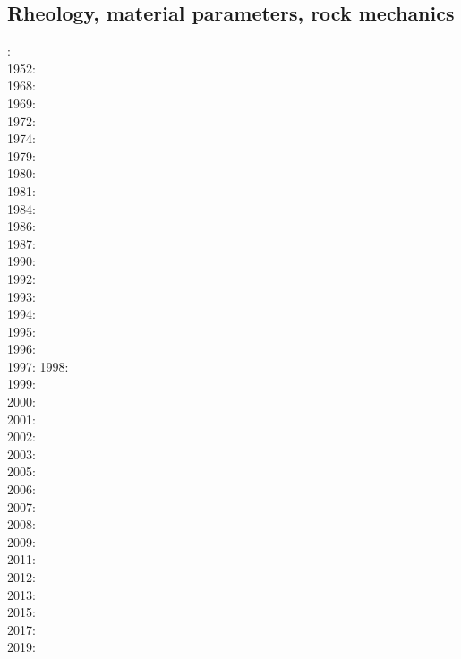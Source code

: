 \subsection{Rheology, material parameters, rock mechanics}

{\scriptsize
{}: \cite{druc51}\cite{hafn51}\\
1952: \cite{drpr52}\\
1968: \cite{byer68}\\
1969: \cite{hand69}\\
1972: \cite{carr72}\\
1974: \cite{kogo74}\\
1979: \cite{goev79}\cite{evgo79}\\
1980: \cite{brko80}\\
1981: \cite{delo81}\\
1984: \cite{rafi84}\cite{chpa84}\cite{vede84}\\
1986: \cite{kapf86}\\
1987: \cite{kikr87}\\
1990: \cite{wica90}\\
1992: \cite{bako92}\cite{chbo92}\cite{kali92}\cite{kohl92}\\
1993: \cite{kawu93}\\
1994: \cite{fran94}\\
1995: \cite{koem95}\cite{gltu95}\\
1996: \cite{wasd96}\cite{hiko96}\\
1997: \cite{eshe97a,eshe97b}
1998: \cite{copo98}\cite{mazk98}\\
1999: \cite{kayk99}\\
2000: \cite{rydr00}\cite{rana00}\cite{meko00a,meko00b}\\
2001: \cite{lova01}\\
2002: \cite{hirt02}\\
2003: \cite{hiko03}\cite{kaju03}\cite{mohi03}\\
2005: \cite{didr05}\cite{drur05}\\
2006: \cite{rygw06}\cite{buwa06}\cite{momu06}\cite{liwr06}\\
2007: \cite{hirw07}\cite{kohl07}\cite{faja07}\\
2008: \cite{lemm08}\cite{budr08}\cite{koka08}\cite{gird08}\\
2009: \cite{kayk09}\cite{kako09}\\
2011: \cite{lell11}\cite{kemk11}\\
2012: \cite{reyn12}\\
2013: \cite{lepo13}\cite{miam13}\cite{mont13}\\
2015: \cite{chpe15}\\
2017: \cite{bocc17}\\
2019: \cite{rejv19}\cite{hakt19}
}

